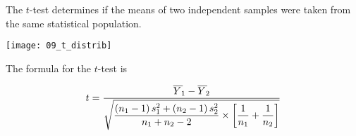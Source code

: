 \documentclass[t]{beamer}
\newcommand*\meanY{\overline{Y\kern1.67pt}\kern-1.67pt}
\begin{document}
%
\begin{frame}{The $t$-test determines if the means of two independent samples  were taken from the same statistical population.}

	\vspace{-\baselineskip}
	
	{\centering
	\texttt{[image: 09\_t\_distrib]}\par
	}

\end{frame}
%
\begin{frame}[t]{The formula for the $t$-test is}

\begin{equation*}
t = \dfrac{\meanY_1 - \meanY_2}{\sqrt{\dfrac{\left(n_1 - 1\right)s_1^2 + \left(n_2 - 1\right)s_2^2}{n_1 + n_2 -2} \times \left[\dfrac{1}{n_1} + \dfrac{1}{n_2}\right]}}
\end{equation*}

\end{frame}
%
\end{document}
